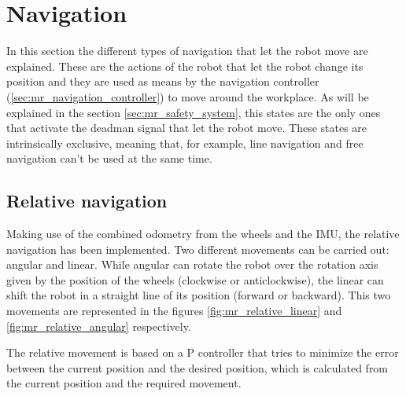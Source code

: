 \section{Navigation} %
\label{sec:mr_navigation}
In this section the different types of navigation that let the robot move are explained.
These are the actions of the robot that let the robot change its position and they are used as means by the navigation controller (\ref{sec:mr_navigation_controller}) to move around the workplace.
As will be explained in the section \ref{sec:mr_safety_system}, this states are the only ones that activate the deadman signal that let the robot move.
These states are intrinsically exclusive, meaning that, for example, line navigation and free navigation can't be used at the same time.

    \subsection{Relative navigation} %
    \label{sub:mr_relative_navigation}
    Making use of the combined odometry from the wheels and the IMU, the relative navigation has been implemented.
    Two different movements can be carried out: angular and linear.
    While angular can rotate the robot over the rotation axis given by the position of the wheels (clockwise or anticlockwise), the linear can shift the robot in a straight line of its position (forward or backward).
    This two movements are represented in the figures \ref{fig:mr_relative_linear} and \ref{fig:mr_relative_angular} respectively.

    The relative movement is based on a P controller that tries to minimize the error between the current position and the desired position, which is calculated from the current position and the required movement.

